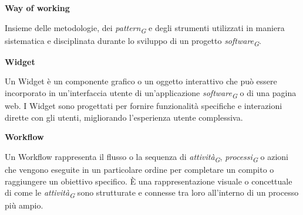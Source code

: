 \documentclass{article}
\begin{document}
\vspace{0.4cm}

\textbf{Way of working}

\vspace{0.1cm}

Insieme delle metodologie, dei \textit{pattern}\textsubscript{\textit{G}} e degli strumenti utilizzati in maniera sistematica e disciplinata durante lo sviluppo di un progetto \textit{software}\textsubscript{\textit{G}}.

\vspace{0.4cm}

\textbf{Widget}

\vspace{0.1cm}

Un Widget è un componente grafico o un oggetto interattivo che può essere incorporato in un'interfaccia utente di un'applicazione \textit{software}\textsubscript{\textit{G}} o di una pagina web. I Widget sono progettati per fornire funzionalità specifiche e interazioni dirette con gli utenti, migliorando l'esperienza utente complessiva.

\vspace{0.4cm}

\textbf{Workflow}

\vspace{0.1cm}

Un Workflow rappresenta il flusso o la sequenza di \textit{attività}\textsubscript{\textit{G}}, \textit{processi}\textsubscript{\textit{G}} o azioni che vengono eseguite in un particolare ordine per completare un compito o raggiungere un obiettivo specifico. È una rappresentazione visuale o concettuale di come le \textit{attività}\textsubscript{\textit{G}} sono strutturate e connesse tra loro all'interno di un processo più ampio.
\end{document}
